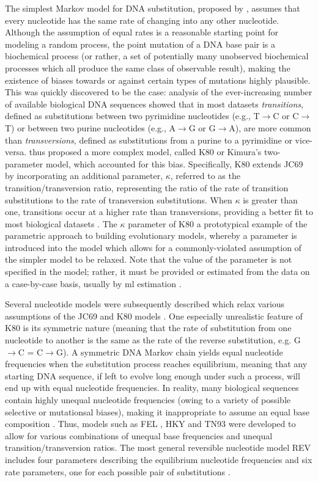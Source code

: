 The simplest Markov model for DNA substitution, proposed by
\citet{Jukes1969a}, assumes that every nucleotide has the same rate of
changing into any other nucleotide. Although the assumption of equal
rates is a reasonable starting point for modeling a random process,
the point mutation of a DNA base pair is a biochemical process (or
rather, a set of potentially many unobserved biochemical processes
which all produce the same class of observable result), making the
existence of biases towards or against certain types of mutations
highly plausible. This was quickly discovered to be the case: analysis
of the ever-increasing number of available biological DNA sequences
showed that in most datasets \emph{transitions}, defined as
substitutions between two pyrimidine nucleotides (e.g., T$\to$C or
C$\to$T) or between two purine nucleotides (e.g., A$\to$G or G$\to$A),
are more common than \emph{transversions}, defined as substitutions
from a purine to a pyrimidine or vice-versa. \citet{Kimura1980} thus
proposed a more complex model, called K80 or Kimura's two-parameter
model, which accounted for this bias. Specifically, K80 extends JC69
by incorporating an additional parameter, $\kappa$, referred to as the
transition/transversion ratio, representing the ratio of the rate of
transition substitutions to the rate of transversion
substitutions. When $\kappa$ is greater than one, transitions occur at
a higher rate than transversions, providing a better fit to most
biological datasets \citep{Brown1982}. The $\kappa$ parameter of K80 a
prototypical example of the parametric approach to building
evolutionary models, whereby a parameter is introduced into the model
which allows for a commonly-violated assumption of the simpler model
to be relaxed. Note that the value of the parameter is not specified
in the model; rather, it must be provided or estimated from the data
on a case-by-case basis, usually by \ac{ml} estimation
\citep{Whelan2001}.

Several nucleotide models were subsequently described which relax
various assumptions of the JC69 and K80 models
\citet{Whelan2001,Yang2006}. One especially unrealistic feature of K80
is its symmetric nature (meaning that the rate of substitution from
one nucleotide to another is the same as the rate of the reverse
substitution, e.g. G$\to$C = C$\to$G). A symmetric DNA Markov chain
yields equal nucleotide frequencies when the substitution process
reaches equilibrium, meaning that any starting DNA sequence, if left
to evolve long enough under such a process, will end up with equal
nucleotide frequencies. In reality, many biological sequences contain
highly unequal nucleotide frequencies (owing to a variety of possible
selective or mutationsal biases), making it inappropriate to assume an
equal base composition \citep{Yang2006}. Thus, models such as FEL
\citep{Felsenstein1981a}, HKY \citep{Hasegawa1985} and TN93
\citep{Tamura1993} were developed to allow for various combinations of
unequal base frequencies and unequal transition/transversion
ratios. The most general reversible nucleotide model REV includes four
parameters describing the equilibrium nucleotide frequencies and six
rate parameters, one for each possible pair of substitutions
\citep{Tavare1986}.

